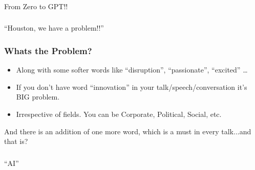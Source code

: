 \begin{frame}[fragile]\frametitle{}
\begin{center}
{\Large From Zero to GPT!!}
\end{center}
\end{frame}

\begin{frame}[fragile]\frametitle{}
\begin{center}
{\Large ``Houston, we have a problem!!''}
\end{center}
\end{frame}

\begin{frame}[fragile]\frametitle{Whats the Problem?}
\begin{itemize}
\item Along with some softer words like ``disruption'', ``passionate'', ``excited'' \ldots
\item If you don't have word ``innovation'' in your talk/speech/conversation it's  BIG problem. 
\item Irrespective of fields. You can be Corporate, Political, Social, etc.
\end{itemize}


And there is an addition of one more word,  which is a must in every talk...and that is?


\end{frame}

\begin{frame}[fragile]\frametitle{}
\begin{center}
{\Large ``AI''}
\end{center}
\end{frame}


